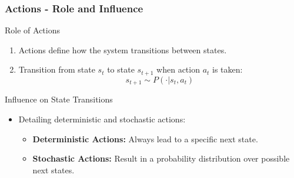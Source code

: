 \documentclass{beamer}
\begin{document}
\begin{frame}[fragile]
    \frametitle{Actions - Role and Influence}
    \begin{block}{Role of Actions}
        \begin{enumerate}
            \item Actions define how the system transitions between states.
            \item Transition from state \( s_t \) to state \( s_{t+1} \) when action \( a_t \) is taken:
            \begin{equation}
                s_{t+1} \sim P(\cdot | s_t, a_t)
            \end{equation}
        \end{enumerate}
    \end{block}
    
    \begin{block}{Influence on State Transitions}
        \begin{itemize}
            \item Detailing deterministic and stochastic actions:
            \begin{itemize}
                \item \textbf{Deterministic Actions:} Always lead to a specific next state.
                \item \textbf{Stochastic Actions:} Result in a probability distribution over possible next states.
            \end{itemize}
        \end{itemize}
    \end{block}
\end{frame}
\end{document}
